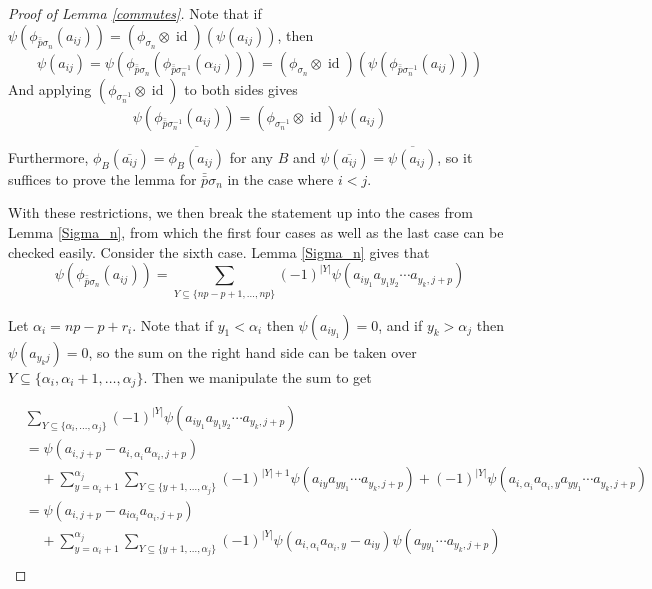 \documentclass[11pt]{amsart}
\def\s{{\sigma}}
\def\a{\alpha}
\def\fp{{\scriptstyle \bar{\bar{p}}}}
\newcommand\id{\operatorname{id}}
\theoremstyle{definition}
\begin{document}
\begin{proof} [Proof of Lemma \ref{commutes}]
Note that if $\psi(\phi_{\fp\s_n}(a_{ij})) = (\phi_{\s_n} \otimes \id)(\psi(a_{ij}))$, then
$$\psi(a_{ij}) = \psi\left(\phi_{\fp\s_n}\left(\phi_{\fp \s^{-1}_n}\left(\a_{ij}\right)\right)\right) =  \left(\phi_{\s_n}\otimes\id\right)\left(\psi\left(\phi_{\fp\s^{-1}_n}\left(a_{ij}\right)\right)\right) $$
And applying $\left(\phi_{\s_n^{-1}}\otimes\id\right)$ to both sides gives
$$\psi\left(\phi_{\fp \s^{-1}_n}\left(a_{ij}\right)\right) = \left(\phi_{\s_n^{-1}}\otimes\id\right)\psi(a_{ij})$$

Furthermore, $\phi_B(\overline{a_{ij}}) = \overline{\phi_B(a_{ij})}$ for any $B$ and $\psi(\overline{a_{ij}}) = \overline{\psi(a_{ij})}$, so it suffices to prove the lemma for $\fp \s_n$ in the case where $i<j$.

With these restrictions, we then break the statement up into the cases from Lemma \ref{Sigma_n}, from which the first four cases as well as the last case can be checked easily.  Consider the sixth case.  Lemma \ref{Sigma_n} gives that
$$\psi\left(\phi_{\fp \s_n}(a_{ij})\right) = \sum_{Y\subseteq \{np-p+1,\ldots,np\}}(-1)^{|Y|}\psi\left(a_{iy_1}a_{y_1y_2}\cdots a_{y_k,j+p}\right)$$


Let $\a_i  = np-p+r_i$.  Note that if $y_1<\a_i$ then $\psi(a_{iy_1}) = 0$, and if $y_k>\a_j$ then $\psi(a_{y_kj}) = 0$, so the sum on the right hand side can be taken over $Y\subseteq\{\a_i,\a_i+1,\ldots,\a_j\}$.  Then we manipulate the sum to get

\begin{align*}
& \sum_{Y\subseteq \{\a_i,\ldots,\a_j\}}(-1)^{|Y|}\psi\left(a_{iy_1}a_{y_1y_2}\cdots a_{y_k,j+p}\right)\\
&= \psi\left(a_{i,j+p} - a_{i,\a_i}a_{\a_i,j+p}\right)\\
& \;\;\;\;+ \sum_{y=\a_i+1}^{\a_j}\sum_{Y\subseteq \{y+1,\ldots,\a_j\}}(-1)^{|Y|+1}\psi\left(a_{iy}a_{yy_1}\cdots a_{y_k,j+p}\right) + (-1)^{|Y|}\psi\left(a_{i,\a_i}a_{\a_i,y}a_{yy_1}\cdots a_{y_k,j+p}\right)\\
&= \psi\left(a_{i,j+p} - a_{i\a_i}a_{\a_i,j+p}\right)\\
& \;\;\;\;+ \sum_{y=\a_i+1}^{\a_j}\sum_{Y\subseteq \{y+1,\ldots,\a_j\}}(-1)^{|Y|}\psi\left(a_{i,\a_i}a_{\a_i,y} - a_{iy}\right)\psi\left(a_{yy_1}\cdots a_{y_k,j+p}\right)\\
\end{align*}




\end{proof}
\end{document}

